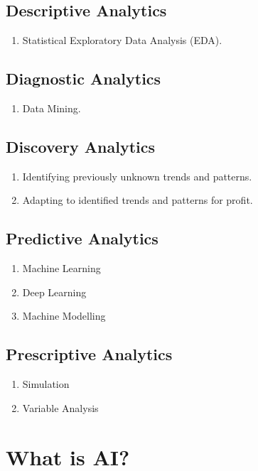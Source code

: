 \documentclass[12pt letter]{report}
\begin{document}
\subsection{Descriptive Analytics}
\begin{enumerate}
  \item Statistical Exploratory Data Analysis (EDA).
\end{enumerate}

\subsection{Diagnostic Analytics}
\begin{enumerate}
  \item Data Mining.
\end{enumerate}
\subsection{Discovery Analytics}
\begin{enumerate}
  \item Identifying previously unknown trends and patterns.
  \item Adapting to identified trends and patterns for profit.
\end{enumerate}
\subsection{Predictive Analytics}
\begin{enumerate}
  \item Machine Learning
  \item Deep Learning
  \item Machine Modelling
\end{enumerate}
\subsection{Prescriptive Analytics}
\begin{enumerate}
  \item Simulation
  \item Variable Analysis
\end{enumerate}

\section{What is AI?}

\end{document}
